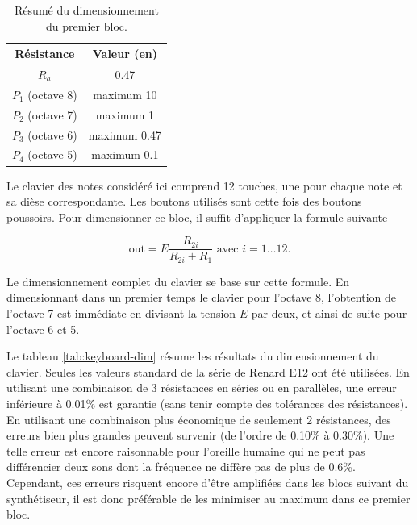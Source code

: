\begin{table}[ht]
	\centering
	\begin{tabular}{|c|c|}
			\hline
				Résistance & Valeur (en\unit{}{\kilo\ohm}) \\
			\hline
				$R_a$ & 0.47 \\
			\hline
				$P_1$ (octave 8) & maximum 10 \\
			\hline
				$P_2$ (octave 7) & maximum 1 \\
			\hline
				$P_3$ (octave 6) & maximum 0.47 \\
			\hline
				$P_4$ (octave 5) & maximum 0.1 \\
			\hline
		\end{tabular}
	\caption{Résumé du dimensionnement du premier bloc.}
	\label{tab:dim-keyboard-first-bloc}
\end{table}

Le clavier des notes considéré ici comprend 12 touches, 
une pour chaque note et sa dièse correspondante. Les boutons
utilisés sont cette fois des boutons poussoirs.
Pour dimensionner ce bloc, il suffit d'appliquer la
formule suivante 

\[ \text{out} = E\frac{R_{2i}}{R_{2i} + R_1} \text{  avec  } i = 1\dots12. \]

Le dimensionnement complet du clavier se base
sur cette formule. En dimensionnant dans un premier
temps le clavier pour l'octave 8, l'obtention
de l'octave 7 est immédiate en divisant la tension
$E$ par deux, et ainsi de suite pour l'octave 6 et 5.

Le tableau \ref{tab:keyboard-dim} résume les résultats du dimensionnement
du clavier. Seules les valeurs standard de la série de Renard
E12 ont été utilisées. En utilisant une combinaison de 3
résistances en séries ou en parallèles, une erreur inférieure
à 0.01\% est garantie (sans tenir compte des tolérances des
résistances). En utilisant une combinaison plus économique
de seulement 2 résistances, des erreurs bien plus grandes
peuvent survenir (de l'ordre de 0.10\% à 0.30\%). Une telle
erreur est encore raisonnable pour l'oreille humaine qui ne
peut pas différencier deux sons dont la fréquence ne diffère
pas de plus de 0.6\%\cite{frequency-jnd}. Cependant, ces erreurs
risquent encore d'être amplifiées dans les blocs suivant du
synthétiseur, il est donc préférable de les minimiser au maximum
dans ce premier bloc.

